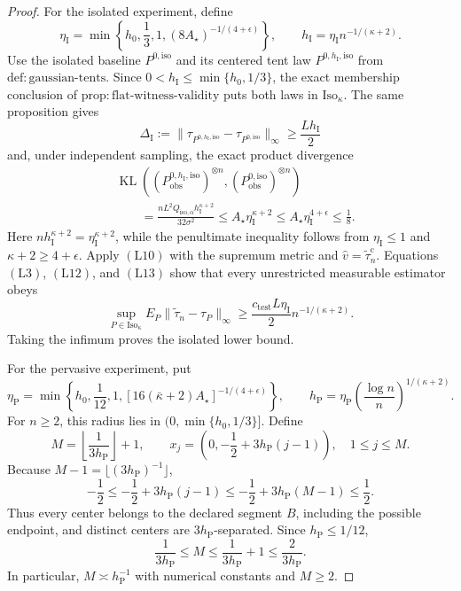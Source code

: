 \documentclass{article}
\begin{document}
\begin{proof}
For the isolated experiment, define
\[
 \eta_{\mathrm I}
 =\min\left\{h_0,\frac13,1,
 (8A_\star)^{-1/(4+\epsilon)}\right\},
 \qquad
 h_{\mathrm I}=\eta_{\mathrm I}n^{-1/(\kappa+2)}.
 \tag{L11}
\]
Use the isolated baseline \(P^{0,\mathrm{iso}}\) and its centered tent law \(P^{0,h_{\mathrm I},\mathrm{iso}}\) from
\(\mathrm{def{:}gaussian\text{-}tents}\).  Since
\(0<h_{\mathrm I}\leq\min\{h_0,1/3\}\), the exact membership conclusion of
\(\mathrm{prop{:}flat\text{-}witness\text{-}validity}\) puts both laws in
\(\mathrm{Iso}_\kappa\).  The same proposition gives
\[
 \Delta_{\mathrm I}:=
 \|\tau_{P^{0,h_{\mathrm I},\mathrm{iso}}}
       -\tau_{P^{0,\mathrm{iso}}}\|_\infty
 \geq\frac{Lh_{\mathrm I}}2
 \tag{L12}
\]
and, under independent sampling, the exact product divergence
\[
\begin{aligned}
 &\operatorname{KL}\!\left(
 (P^{0,h_{\mathrm I},\mathrm{iso}}_{\mathrm{obs}})^{\otimes n},
 (P^{0,\mathrm{iso}}_{\mathrm{obs}})^{\otimes n}\right)\\
 &\qquad=
 \frac{nL^2Q_{\mathrm{iso},\alpha}h_{\mathrm I}^{\kappa+2}}
      {32\sigma^2}
 \leq A_\star\eta_{\mathrm I}^{\kappa+2}
 \leq A_\star\eta_{\mathrm I}^{4+\epsilon}
 \leq\frac18.
\end{aligned}
 \tag{L13}
\]
Here \(n h_{\mathrm I}^{\kappa+2}=\eta_{\mathrm I}^{\kappa+2}\), while the penultimate inequality follows from \(\eta_{\mathrm I}\leq1\) and \(\kappa+2\geq4+\epsilon\).  Apply \((\mathrm{L10})\) with the supremum metric and \(\widehat v=\widetilde\tau_n^{\mathrm c}\).  Equations \((\mathrm{L3})\), \((\mathrm{L12})\), and \((\mathrm{L13})\) show that every unrestricted measurable estimator obeys
\[
 \sup_{P\in\mathrm{Iso}_\kappa}
 E_P\|\widetilde\tau_n-\tau_P\|_\infty
 \geq\frac{c_{\mathrm{test}}L\eta_{\mathrm I}}2
 n^{-1/(\kappa+2)}.
 \tag{L14}
\]
Taking the infimum proves the isolated lower bound.

For the pervasive experiment, put
\[
 \eta_{\mathrm P}
 =\min\left\{h_0,\frac1{12},1,
 [16(\bar\kappa+2)A_\star]^{-1/(4+\epsilon)}\right\},
 \qquad
 h_{\mathrm P}=\eta_{\mathrm P}
 \left(\frac{\log n}{n}\right)^{1/(\kappa+2)}.
 \tag{L15}
\]
For \(n\geq2\), this radius lies in \((0,\min\{h_0,1/3\}]\).  Define
\[
 M=\left\lfloor\frac1{3h_{\mathrm P}}\right\rfloor+1,
 \qquad
 x_j=\left(0,-\frac12+3h_{\mathrm P}(j-1)\right),
 \quad 1\leq j\leq M.
 \tag{L16}
\]
Because \(M-1=\lfloor(3h_{\mathrm P})^{-1}\rfloor\),
\[
 -\frac12\leq-\frac12+3h_{\mathrm P}(j-1)
 \leq-\frac12+3h_{\mathrm P}(M-1)\leq\frac12.
 \tag{L17}
\]
Thus every center belongs to the declared segment \(B\), including the possible endpoint, and distinct centers are \(3h_{\mathrm P}\)-separated.  Since \(h_{\mathrm P}\leq1/12\),
\[
 \frac1{3h_{\mathrm P}}
 \leq M
 \leq\frac1{3h_{\mathrm P}}+1
 \leq\frac2{3h_{\mathrm P}}.
 \tag{L18}
\]
In particular, \(M\asymp h_{\mathrm P}^{-1}\) with numerical constants and \(M\geq2\).


\end{proof}
\end{document}
